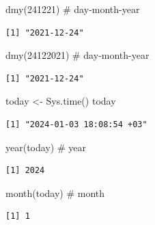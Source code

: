 \documentclass[
  letterpaper,
  DIV=11,
  numbers=noendperiod]{scrreprt}
\newenvironment{Shaded}{\begin{snugshade}}{\end{snugshade}}
\newcommand{\CommentTok}[1]{\textcolor[rgb]{0.37,0.37,0.37}{#1}}
\newcommand{\DecValTok}[1]{\textcolor[rgb]{0.68,0.00,0.00}{#1}}
\newcommand{\FunctionTok}[1]{\textcolor[rgb]{0.28,0.35,0.67}{#1}}
\newcommand{\NormalTok}[1]{\textcolor[rgb]{0.00,0.23,0.31}{#1}}
\newcommand{\OtherTok}[1]{\textcolor[rgb]{0.00,0.23,0.31}{#1}}
\begin{document}
\begin{Shaded}
\begin{Highlighting}[]
\FunctionTok{dmy}\NormalTok{(}\DecValTok{241221}\NormalTok{) }\CommentTok{\# day{-}month{-}year}
\end{Highlighting}
\end{Shaded}

\begin{verbatim}
[1] "2021-12-24"
\end{verbatim}

\begin{Shaded}
\begin{Highlighting}[]
\FunctionTok{dmy}\NormalTok{(}\DecValTok{24122021}\NormalTok{) }\CommentTok{\# day{-}month{-}year}
\end{Highlighting}
\end{Shaded}

\begin{verbatim}
[1] "2021-12-24"
\end{verbatim}

\begin{Shaded}
\begin{Highlighting}[]
\NormalTok{today }\OtherTok{\textless{}{-}} \FunctionTok{Sys.time}\NormalTok{()}
\NormalTok{today}
\end{Highlighting}
\end{Shaded}

\begin{verbatim}
[1] "2024-01-03 18:08:54 +03"
\end{verbatim}

\begin{Shaded}
\begin{Highlighting}[]
\FunctionTok{year}\NormalTok{(today) }\CommentTok{\# year}
\end{Highlighting}
\end{Shaded}

\begin{verbatim}
[1] 2024
\end{verbatim}

\begin{Shaded}
\begin{Highlighting}[]
\FunctionTok{month}\NormalTok{(today) }\CommentTok{\# month}
\end{Highlighting}
\end{Shaded}

\begin{verbatim}
[1] 1
\end{verbatim}
\end{document}

